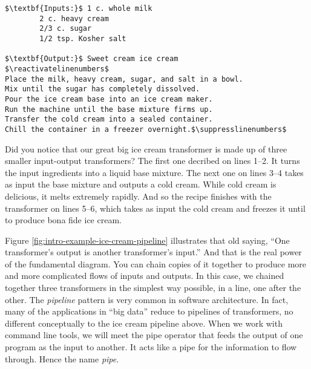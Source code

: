 \suppresslinenumbers
\begin{lstlisting}[caption={\label{listing:intro-ice-cream} Ice cream transformer. It's as short as it is sweet.}, escapeinside=$$, firstnumber=0]
$\textbf{Inputs:}$ 1 c. whole milk
        2 c. heavy cream
        2/3 c. sugar
        1/2 tsp. Kosher salt

$\textbf{Output:}$ Sweet cream ice cream
$\reactivatelinenumbers$
Place the milk, heavy cream, sugar, and salt in a bowl.
Mix until the sugar has completely dissolved.
Pour the ice cream base into an ice cream maker.
Run the machine until the base mixture firms up.
Transfer the cold cream into a sealed container.
Chill the container in a freezer overnight.$\suppresslinenumbers$
\end{lstlisting}

Did you notice that our great big ice cream transformer is made up of three smaller input-output transformers? The first one decribed on lines 1--2. It turns the input ingredients into a liquid base mixture. The next one on lines 3--4 takes as input the base mixture and outputs a cold cream. While cold cream is delicious, it melts extremely rapidly. And so the recipe finishes with the transformer on lines 5--6, which takes as input the cold cream and freezes it until to produce bona fide ice cream.

\begin{figure*}[h]
  
  \caption{\label{fig:intro-example-ice-cream-pipeline} The steps inside transformers are often simpler transformers. The transfromation that produces ice cream from ingredients is made up of three successive transformers. The output of one transformer is the input to the next transformer.}
\end{figure*}

Figure \ref{fig:intro-example-ice-cream-pipeline} illustrates that old saying, ``One transformer's output is another transformer's input.'' And that is the real power of the fundamental diagram. You can chain copies of it together to produce more and more complicated flows of inputs and outputs. In this case, we chained together three transformers in the simplest way possible, in a line, one after the other. The \emph{pipeline} pattern is very common in software architecture. In fact, many of the applications in ``big data'' reduce to pipelines of transformers, no different conceptually to the ice cream pipeline above. When we work with command line tools, we will meet the pipe operator that feeds the output of one program as the input to another. It acts like a pipe for the information to flow through. Hence the name \emph{pipe}.

